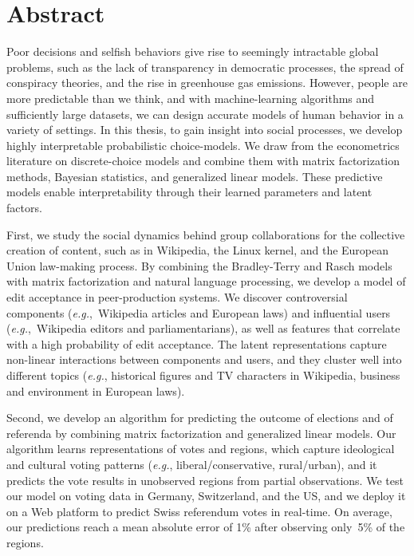 \cleardoublepage
\chapter*{Abstract}

Poor decisions and selfish behaviors give rise to seemingly intractable global problems, such as the lack of transparency in democratic processes, the spread of conspiracy theories, and the rise in greenhouse gas emissions.
However, people are more predictable than we think, and with machine-learning algorithms and sufficiently large datasets, we can design accurate models of human behavior in a variety of settings.
In this thesis, to gain insight into social processes, we develop highly interpretable probabilistic choice-models.
We draw from the econometrics literature on discrete-choice models and combine them with matrix factorization methods, Bayesian statistics, and generalized linear models.
These predictive models enable interpretability through their learned parameters and latent factors.

First, we study the social dynamics behind group collaborations for the collective creation of content, such as in Wikipedia, the Linux kernel, and the European Union law-making process.
By combining the Bradley-Terry and Rasch models with matrix factorization and natural language processing, we develop a model of edit acceptance in peer-production systems.
We discover controversial components (\textit{e.g.},~Wikipedia articles and European laws) and influential users (\textit{e.g.},~Wikipedia editors and parliamentarians), as well as features that correlate with a high probability of edit acceptance.
The latent representations capture non-linear interactions between components and users, and they cluster well into different topics (\textit{e.g.}, historical figures and TV characters in Wikipedia, business and environment in European laws).

Second, we develop an algorithm for predicting the outcome of elections and of referenda by combining matrix factorization and generalized linear models.
Our algorithm learns representations of votes and regions, which capture ideological and cultural voting patterns (\textit{e.g.}, liberal/conservative, rural/urban), and it predicts the vote results in unobserved regions from partial observations.
We test our model on voting data in Germany, Switzerland, and the US, and we deploy it on a Web platform to predict Swiss referendum votes in real-time.
On average, our predictions reach a mean absolute error of 1\% after observing only~5\% of the regions.


